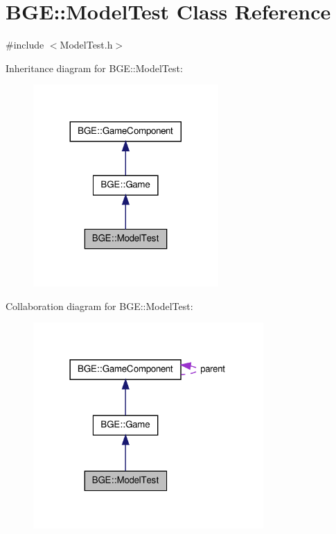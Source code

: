\hypertarget{class_b_g_e_1_1_model_test}{\section{B\-G\-E\-:\-:Model\-Test Class Reference}
\label{class_b_g_e_1_1_model_test}
}


{\ttfamily \#include $<$Model\-Test.\-h$>$}



Inheritance diagram for B\-G\-E\-:\-:Model\-Test\-:
\nopagebreak
\begin{figure}[H]
\begin{center}
\leavevmode
\includegraphics[width=200pt]{class_b_g_e_1_1_model_test__inherit__graph}
\end{center}
\end{figure}


Collaboration diagram for B\-G\-E\-:\-:Model\-Test\-:
\nopagebreak
\begin{figure}[H]
\begin{center}
\leavevmode
\includegraphics[width=249pt]{class_b_g_e_1_1_model_test__coll__graph}
\end{center}
\end{figure}
